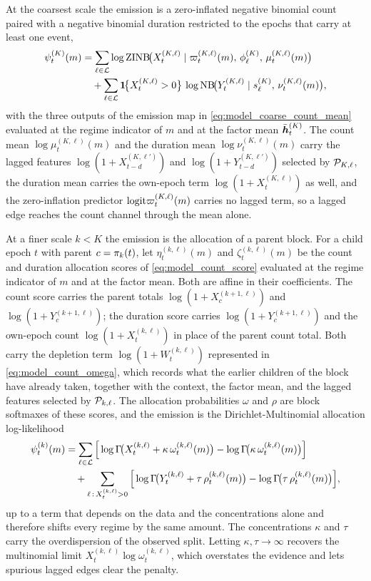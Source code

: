 At the coarsest scale the emission is a zero-inflated negative binomial count paired with a
negative binomial duration restricted to the epochs that carry at least one event,
\begin{align}
\psi_t^{(K)}(m)
&=
\sum_{\ell \in {\mathcal{L}}}
\log \mathrm{ZINB}\!\big(X_t^{(K,\ell)} \mid \varpi_t^{(K,\ell)}(m),\, \phi_\ell^{(K)},\, \mu_t^{(K,\ell)}(m)\big)
\nonumber\\
&\quad
+
\sum_{\ell \in {\mathcal{L}}}
\mathbf{1}\!\big\{X_t^{(K,\ell)} > 0\big\}\,
\log \mathrm{NB}\!\big(Y_t^{(K,\ell)} \mid s_\ell^{(K)},\, \nu_t^{(K,\ell)}(m)\big),
\label{eq:learn_psi_coarse}
\end{align}
with the three outputs of the emission map in
\cref{eq:model_coarse_count_mean} evaluated at
the regime indicator of $m$ and at the factor mean $\bar{{\bm{h}}}_t^{(K)}$. The count mean
$\log\mu_t^{(K,\ell)}(m)$ and the duration mean $\log\nu_t^{(K,\ell)}(m)$ carry the lagged features
$\log(1+X_{t-d}^{(K,\ell')})$ and $\log(1+Y_{t-d}^{(K,\ell')})$ selected by ${\mathcal{P}}_{K,\ell}$, the
duration mean carries the own-epoch term $\log(1+X_t^{(K,\ell)})$ as well, and the zero-inflation
predictor $\mathrm{logit} \varpi_t^{(K,\ell)}(m)$ carries no lagged term, so a lagged edge reaches the
count channel through the mean alone.

At a finer scale $k < K$ the emission is the allocation of a parent block. For a child epoch $t$
with parent $c = \pi_k(t)$, let $\eta_t^{(k,\ell)}(m)$ and $\zeta_t^{(k,\ell)}(m)$ be the
count and duration allocation scores of \cref{eq:model_count_score} evaluated at
the regime indicator of $m$ and at the factor mean. Both are affine in their coefficients. The
count score carries the parent totals $\log(1+X_c^{(k+1,\ell)})$ and $\log(1+Y_c^{(k+1,\ell)})$;
the duration score carries $\log(1+Y_c^{(k+1,\ell)})$ and the own-epoch count
$\log(1+X_t^{(k,\ell)})$ in place of the parent count total. Both carry the depletion term
$\log(1+W_t^{(k,\ell)})$ represented in \cref{eq:model_count_omega}, which records what the earlier children of
the block have already taken, together with the context, the factor mean, and the lagged features
selected by ${\mathcal{P}}_{k,\ell}$. The allocation probabilities $\omega$ and $\rho$ are block softmaxes
of these scores, and the emission is the Dirichlet-Multinomial allocation log-likelihood
\begin{align}
\psi_t^{(k)}(m)
&=
\sum_{\ell \in {\mathcal{L}}}
\Big[
\log\Gamma\!\big(X_t^{(k,\ell)} + \kappa\,\omega_t^{(k,\ell)}(m)\big)
-
\log\Gamma\!\big(\kappa\,\omega_t^{(k,\ell)}(m)\big)
\Big]
\nonumber\\
&\quad
+
\sum_{\ell \,:\, X_t^{(k,\ell)}>0}
\Big[
\log\Gamma\!\big(Y_t^{(k,\ell)} + \tau\,\rho_t^{(k,\ell)}(m)\big)
-
\log\Gamma\!\big(\tau\,\rho_t^{(k,\ell)}(m)\big)
\Big],
\label{eq:learn_psi_fine}
\end{align}
up to a term that depends on the data and the concentrations alone and therefore shifts every
regime by the same amount. The concentrations $\kappa$ and $\tau$ carry the overdispersion of the
observed split. Letting $\kappa,\tau \to \infty$ recovers the multinomial limit
$X_t^{(k,\ell)} \log \omega_t^{(k,\ell)}$, which overstates the evidence and lets spurious lagged
edges clear the penalty.

